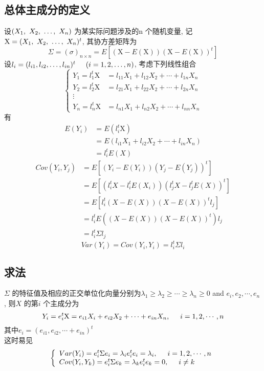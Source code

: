 \documentclass{article}
\begin{document}
\subsection{总体主成分的定义}
设$(X_1,~X_2,~\ldots,~X_n)$ 为某实际问题涉及的n 个随机变量, 记$\mathrm{X} = (X_1,~X_2,~\ldots,~X_n)^t$, 其协方差矩阵为
$$
\Sigma = (\sigma)_{n \times n} = E[(\mathrm{X} - E(\mathrm{X}))(\mathrm{X} - E(\mathrm{X}))^t]
$$
设$l_i = (l_{i1},l_{i2},\dots,l_{in})^t \hspace{0.5cm} (i=1,2,\dots,n)$, 考虑下列线性组合
$$
\left\{
  \begin{array}{ll}
	  Y_1 = l_1^t \mathrm{X} & = l_{11}X_1 + l_{12}X_2 + \cdots + l_{1n}X_n \\
	  Y_2 = l_2^t \mathrm{X} & = l_{21}X_1 + l_{22}X_2 + \cdots + l_{2n}X_n \\
		  \vdots\\
	  Y_n = l_n^t \mathrm{X} & = l_{n1}X_1 + l_{n2}X_2 + \cdots + l_{nn}X_n
  \end{array}
\right.
$$
有
$$
\begin{aligned}
E(Y_i)
& = E(l_i^t \mathrm{X}) \\
& = E(l_{i1}X_1 + l_{i2}X_2 + \cdots + l_{in}X_n) \\
& = l_{i}^t E(X)
\end{aligned}
$$
$$
\begin{aligned}
Cov(Y_i,Y_j)
& = E[(Y_i - E(Y_i))(Y_j - E(Y_j))^t] \\
& = E[(l_i^tX - l_i^tE(X_i))(l_j^tX - l_j^tE(X))^t] \\
& = E[l_i^t (X-E(X)) (X-E(X))^t l_j]\\
& = l_i^t E((X-E(X))(X-E(X))^t) l_j \\
& = l_i^t \Sigma l_j
\end{aligned}
$$
$$Var(Y_i) = Cov(Y_i,Y_i) = l_i^t \Sigma l_i$$

\subsection{求法}
$\Sigma$ 的特征值及相应的正交单位化向量分别为$\lambda_1 \geq \lambda_2 \geq \cdots \geq \lambda_n \geq 0$ and $e_i,e_2,\cdots,e_n$, 则$X$ 的第$i$ 个主成分为
$$ Y_i = e_i^t \mathrm{X} = e_{i1}X_i + e_{i2}X_2 + \cdots + e_{in}X_n, \hspace{0.5cm} i=1,2,\cdots,n $$
其中$e_i = (e_{i1}, e_{i2}, \cdots+ e_{in})^t $\\
这时易见
$$
\left\{
	\begin{array}{l}
		Var(Y_i) = e_i^t \Sigma e_i = \lambda_i e_i^t e_i = \lambda_i, \hspace{0.5cm} i = 1,2,\cdots,n\\
		Cov(Y_i,Y_k) = e_i^t \Sigma e_k = \lambda_k e_i^t e_k = 0, \hspace{0.5cm} i \neq k
	\end{array}
\right.
$$
\end{document}
